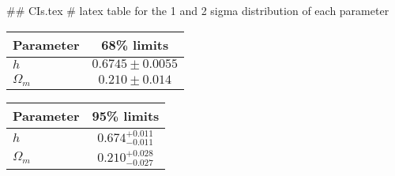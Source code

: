 ## CIs.tex
# latex table for the 1 and 2 sigma distribution of each parameter

\begin{tabular} { l  c}
 Parameter &  68\% limits\\
\hline
{\boldmath$h              $} & $0.6745\pm 0.0055          $\\
{\boldmath$\Omega_m       $} & $0.210\pm 0.014            $\\
\hline
\end{tabular}

\begin{tabular} { l  c}
 Parameter &  95\% limits\\
\hline
{\boldmath$h              $} & $0.674^{+0.011}_{-0.011}   $\\
{\boldmath$\Omega_m       $} & $0.210^{+0.028}_{-0.027}   $\\
\hline
\end{tabular}
